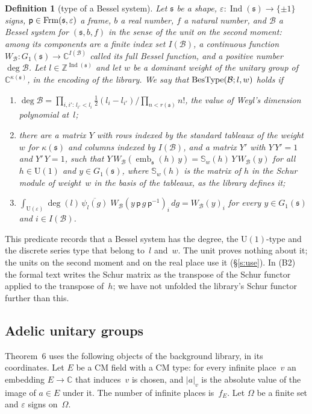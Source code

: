 \documentclass[11pt,a4paper]{article}
\makeatletter
\newcommand{\lean}[1]{\csname LN@#1\endcsname}
\newcommand{\kw}[1]{\emph{#1}}
\newcommand{\m}[1]{\mbox{$#1$}}        %
\newcommand{\leantag}{{\sffamily\bfseries\fontsize{6.3}{8}\selectfont\color{leancol}\addfontfeatures{LetterSpace=7}LEAN}}
\newcommand{\leanline}[1]{\par\nopagebreak\vspace{-2.5pt}{\fontsize{8.9}{12.4}\selectfont\color{inksoft}\raggedright
  \noindent\llap{\leantag\hspace{9pt}}#1\par}\vspace{1pt}}
\theoremstyle{plainx}
\theoremstyle{uprightx}
\newtheorem{definition}[theorem]{Definition}
\newcommand{\CC}{\mathbb{C}}
\newcommand{\ZZ}{\mathbb{Z}}
\newcommand{\fs}{\mathfrak{s}}
\newcommand{\fp}{\mathsf{p}}
\newcommand{\abs}[1]{\lvert #1\rvert}
\newcommand{\Us}[1]{\mathrm{U}(#1)}                      %
\newcommand{\dsc}[2]{\psi_{#1}(#2)}                      %
\newcommand{\fdeg}[1]{\deg(#1)}                          %
\newcommand{\kps}[1]{\kappa(#1)}                         %
\newcommand{\rsh}[1]{r(#1)}                              %
\newcommand{\Ind}[1]{\operatorname{Ind}(#1)}             %
\newcommand{\Gone}[1]{G_{1}(#1)}                         %
\newcommand{\emb}[2]{\operatorname{emb}_{#1}(#2)}        %
\makeatother
\begin{document}
\begin{definition}[type of a Bessel system]\label{d:bestype}
Let $\fs$ be a shape, $\varepsilon\colon\Ind{\fs}\to\{\pm1\}$ signs, \m{\fp\in\frm{\fs}{\varepsilon}} a frame, $b$ a
real number, $f$ a natural number, and $\mathcal{B}$ a Bessel system for \m{(\fs,b,f)} in the sense of the unit on
the second moment: among its components are a finite index set $I(\mathcal{B})$, a continuous function
$W_{\mathcal{B}}\colon\Gone{\fs}\to\CC^{I(\mathcal{B})}$ called its full Bessel function, and a positive number
\m{\deg\mathcal{B}}. Let \m{l\in\ZZ^{\Ind{\fs}}} and let $w$ be a dominant weight of the unitary group of $\CC^{\kps{\fs}}$, in the encoding of the library. We say that
\m{\isbes{\mathcal{B}}{l}{w}} \kw{holds} if
\begin{enumerate}[label=\textup{(B\arabic*)},leftmargin=2.9em,itemsep=1pt]
\item $\deg\mathcal{B}=\prod_{i,i':\,l_{i'}<l_i}\tfrac12(l_i-l_{i'})\big/\prod_{n<\rsh{\fs}}n!$, the value of Weyl's
  dimension polynomial at~$l$;
\item there are a matrix $Y$ with rows indexed by the standard tableaux of the weight~$w$ for $\kps{\fs}$ and
  columns indexed by $I(\mathcal{B})$, and a matrix $Y'$ with \m{Y\,Y'=1} and \m{Y'\,Y=1}, such that
  $Y\,W_{\mathcal{B}}(\emb{\fs}{h}\,y)=\mathbb{S}_w(h)\,Y\,W_{\mathcal{B}}(y)$ for all \m{h\in\Us{1}} and
  \m{y\in\Gone{\fs}}, where $\mathbb{S}_w(h)$ is the matrix of $h$ in the Schur module of weight~$w$ in the basis of
  the tableaux, as the library defines it;
\item $\int_{\Us{\varepsilon}}\fdeg{l}\,\overline{\dsc{l}{g}}\;W_{\mathcal{B}}(y\,\fp\,g\,\fp^{-1})_i\,dg=W_{\mathcal{B}}(y)_i$
  for every \m{y\in\Gone{\fs}} and \m{i\in I(\mathcal{B})}.
\end{enumerate}
\end{definition}
\leanline{\lean{IsBessel}}

This predicate records that a Bessel system has the degree, the $\Us{1}$-type and the discrete series type that
belong to~$l$ and~$w$. The unit proves nothing about it; the units on the second moment and on the real place use
it (§\ref{s:use}). In (B2) the formal text writes the Schur matrix as the transpose of the Schur functor applied
to the transpose of~$h$; we have not unfolded the library's Schur functor further than this.

\subsection*{\normalsize Adelic unitary groups}\label{s:adelic}
Theorem~6 uses the following objects of the background library, in its coordinates. Let $E$ be a CM field with a
CM type: for every infinite place~$v$ an embedding \m{E\to\CC} that induces~$v$ is chosen, and \m{\abs{a}_v} is the
absolute value of the image of \m{a\in E} under it. The number of infinite places is~$f_E$. Let $\Omega$ be a finite
set and $\varepsilon$ signs on~$\Omega$.
\end{document}
